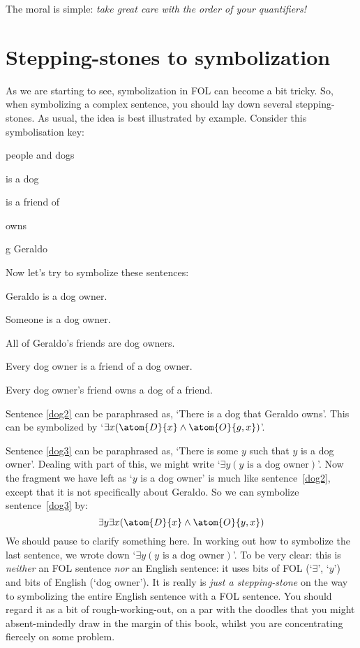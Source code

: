 The moral is simple: \emph{take great care with the order of your quantifiers!}


\section{Stepping-stones to symbolization}
As we are starting to see, symbolization in FOL can become a bit tricky. So, when symbolizing a complex sentence, you should lay down several stepping-stones. As usual, the idea is best illustrated by example. Consider this symbolisation key: 
\begin{ekey}
\item[\text{domain}] people and dogs
\item[\atom{D}{x}]  is a dog
\item[\atom{F}{x,y}]  is a friend of 
\item[\atom{O}{x,y}]  owns 
\item[g] Geraldo
\end{ekey}
Now let's try to symbolize these sentences:
\begin{earg}
\item[\ex{dog2}] Geraldo is a dog owner.
\item[\ex{dog3}] Someone is a dog owner.
\item[\ex{dog4}] All of Geraldo's friends are dog owners.
\item[\ex{dog5}] Every dog owner is a friend of a dog owner.
\item[\ex{dog6}] Every dog owner's friend owns a dog of a friend.
\end{earg}
Sentence \ref{dog2} can be paraphrased as, `There is a dog that Geraldo owns'. This can be symbolized by `$\exists x(\atom{D}{x} \eand \atom{O}{g,x})$'.

Sentence \ref{dog3} can be paraphrased as, `There is some $y$ such that $y$ is a dog owner'. Dealing with part of this, we might write `$\exists y(y\text{ is a dog owner})$'. Now the fragment we have left as `$y$ is a dog owner' is much like sentence~\ref{dog2}, except that it is not specifically about Geraldo. So we can symbolize sentence~\ref{dog3} by:
$$\exists y \exists x(\atom{D}{x} \eand \atom{O}{y,x})$$
We should pause to clarify something here. In working out how to symbolize the last sentence, we wrote down `$\exists y(y\text{ is a dog owner})$'. To be very clear: this is \emph{neither} an FOL sentence \emph{nor} an English sentence: it uses bits of FOL (`$\exists$', `$y$') and bits of English (`dog owner'). It is really is \emph{just a stepping-stone} on the way to symbolizing the entire English sentence with a FOL sentence. You should regard it as a bit of rough-working-out, on a par with the doodles that you might absent-mindedly draw in the margin of this book, whilst you are concentrating fiercely on some problem.  

